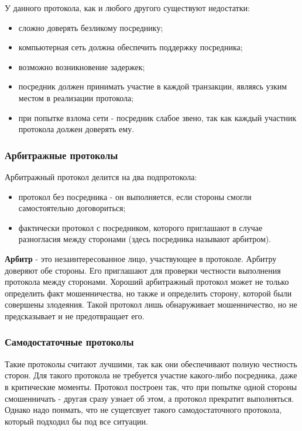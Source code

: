 \documentclass[a4paper]{article}
\begin{document}
У данного протокола, как и любого другого существуют недостатки:
\begin{itemize}
    \item сложно доверять безликому посреднику;
    \item компьютерная сеть должна обеспечить поддержку посредника;
    \item возможно возникновение задержек;
    \item посредник должен принимать участие в каждой транзакции, являясь узким местом в реализации протокола;
    \item при попытке взлома сети - посредник слабое звено, так как каждый участник протокола должен доверять ему.
\end{itemize}
\subsubsection{Арбитражные протоколы}
Арбитражный протокол делится на два подпротокола:
\begin{itemize}
    \item протокол без посредника - он выполняется, если стороны смогли самостоятельно договориться;
    \item фактически протокол с посредником, которого приглашают в случае разногласия между сторонами (здесь посредника называют арбитром).
\end{itemize} 
\par 
\textbf{Арбитр} - это незаинтересованное лицо, участвующее в протоколе. Арбитру доверяют обе стороны. Его приглашают для проверки честности выполнения протокола между сторонами.
Хороший арбитражный протокол может не только определить факт мошенничества, но также и определить сторону, которой были совершены злодеяния. Такой протокол лишь обнаруживает мошенничество, но не предсказывает и не предотвращает его.
\subsubsection{Самодостаточные протоколы}
Такие протоколы считают лучшими, так как они обеспечивают полную честность сторон. Для такого протокола не требуется участие какого-либо посредника, даже в критические моменты. Протокол построен так, что при попытке одной стороны смошенничать - другая сразу узнает об этом, а протокол прекратит выполняться.
Однако надо понмать, что не сущетсвует такого самодостаточного протокола, который подходил бы под все ситуации. 
\end{document}
